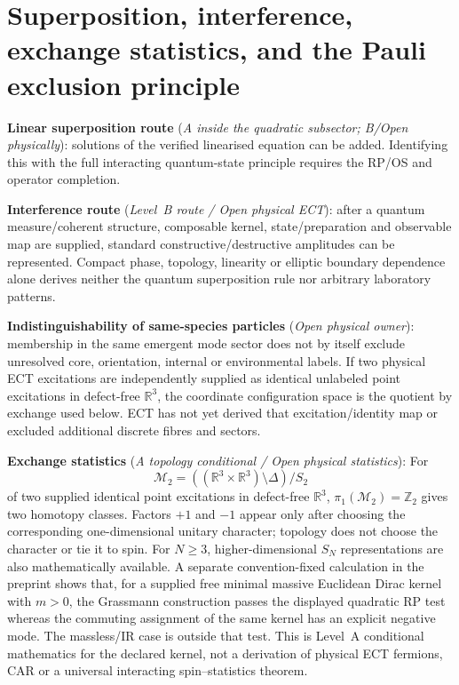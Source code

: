 \documentclass[11pt,a4paper]{article}
\begin{document}
\section{Superposition, interference, exchange statistics, and the Pauli exclusion principle}

\textbf{Linear superposition route} (\emph{A inside the quadratic subsector; B/Open physically}): solutions of the verified linearised equation can be added. Identifying this with the full interacting quantum-state principle requires the RP/OS and operator completion.

\textbf{Interference route} (\emph{Level~B route / Open physical ECT}):
after a quantum measure/coherent structure, composable kernel,
state/preparation and observable map are supplied, standard
constructive/destructive amplitudes can be represented.  Compact phase,
topology, linearity or elliptic boundary dependence alone derives neither the
quantum superposition rule nor arbitrary laboratory patterns.

\textbf{Indistinguishability of same-species particles} (\emph{Open physical owner}): membership in the same emergent mode sector does not by itself exclude unresolved core, orientation, internal or environmental labels.  If two physical ECT excitations are independently supplied as identical unlabeled point excitations in defect-free $\mathbb R^3$, the coordinate configuration space is the quotient by exchange used below.  ECT has not yet derived that excitation/identity map or excluded additional discrete fibres and sectors.

\textbf{Exchange statistics} (\emph{A topology conditional / Open physical statistics}): For
\[
 \mathcal M_2=((\mathbb R^3\times\mathbb R^3)\setminus\Delta)/S_2
\]
of two supplied identical point excitations in defect-free $\mathbb R^3$,
$\pi_1(\mathcal M_2)=\mathbb Z_2$ gives two homotopy classes.  Factors
$+1$ and $-1$ appear only after choosing the corresponding one-dimensional
unitary character; topology does not choose the character or tie it to spin.
For $N\ge3$, higher-dimensional $S_N$ representations are also mathematically
available.  A separate convention-fixed calculation in the preprint shows
that, for a supplied free minimal massive Euclidean Dirac kernel with $m>0$,
the Grassmann construction passes the displayed quadratic RP test whereas
the commuting assignment of the same kernel has an explicit negative mode.
The massless/IR case is outside that test.  This is Level~A conditional
mathematics for the declared kernel, not a derivation of physical ECT
fermions, CAR or a universal interacting spin--statistics theorem.
\end{document}
